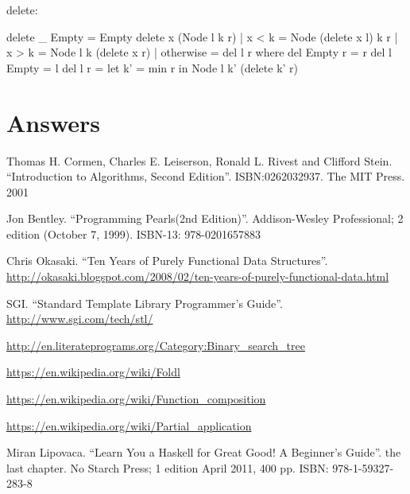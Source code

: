 \documentclass[b5paper]{article}
\begin{document}
delete:

\begin{Haskell}
delete _ Empty = Empty
delete x (Node l k r) | x < k = Node (delete x l) k r
                      | x > k = Node l k (delete x r)
                      | otherwise = del l r
  where
    del Empty r = r
    del l Empty = l
    del l r = let k' = min r in Node l k' (delete k' r)
\end{Haskell}

\ifx\wholebook\relax \else
\section{Answers}
\shipoutAnswer

\begin{thebibliography}{99}

Thomas H. Cormen, Charles E. Leiserson, Ronald L. Rivest and Clifford Stein.
``Introduction to Algorithms, Second Edition''. ISBN:0262032937. The MIT Press. 2001

Jon Bentley. ``Programming Pearls(2nd Edition)''. Addison-Wesley Professional; 2 edition (October 7, 1999). ISBN-13: 978-0201657883

Chris Okasaki. ``Ten Years of Purely Functional Data Structures''. \url{http://okasaki.blogspot.com/2008/02/ten-years-of-purely-functional-data.html}

SGI. ``Standard Template Library Programmer's Guide''. \url{http://www.sgi.com/tech/stl/}

\url{http://en.literateprograms.org/Category:Binary_search_tree}

\url{https://en.wikipedia.org/wiki/Foldl}

\url{https://en.wikipedia.org/wiki/Function_composition}

\url{https://en.wikipedia.org/wiki/Partial_application}

Miran Lipovaca. ``Learn You a Haskell for Great Good! A Beginner's Guide''. the last chapter. No Starch Press; 1 edition April 2011, 400 pp. ISBN: 978-1-59327-283-8

\end{thebibliography}

\expandafter\enddocument
\fi
\end{document}
